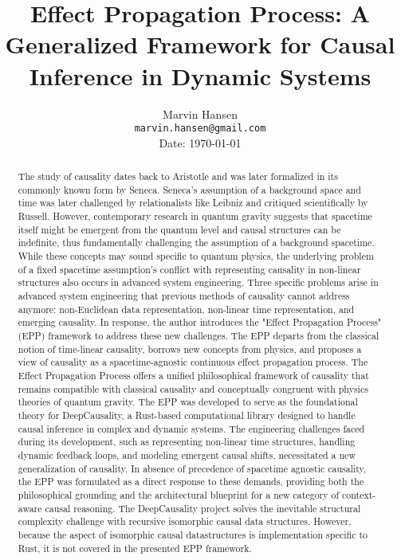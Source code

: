 \documentclass{article}
\title{Effect Propagation Process: A Generalized Framework for Causal Inference in Dynamic Systems}
\author{
  Marvin Hansen \\
  \texttt{marvin.hansen@gmail.com} \\
   Date: \today
}
\begin{document}
\maketitle

\begin{abstract}
The study of causality dates back to Aristotle and was later formalized in its commonly known form by Seneca. Seneca’s assumption of a background space and time was later challenged by relationalists like Leibniz and critiqued scientifically by Russell. However, contemporary research in quantum gravity suggests that spacetime itself might be emergent from the quantum level 
and causal structures can be indefinite, thus fundamentally challenging the assumption of a background spacetime. 
While these concepts may sound specific to quantum physics, the underlying problem of a fixed spacetime assumption's conflict with representing causality in non-linear structures also occurs in advanced system engineering. 
Three specific problems arise in advanced system engineering that previous methods of causality cannot address anymore: 
non-Euclidean data representation, non-linear time representation, and emerging causality.\newline
In response, the author introduces the "Effect Propagation Process" (EPP) framework to address these new challenges. 
The EPP departs from the classical notion of time-linear causality, borrows new concepts from physics, and proposes 
a view of  causality as a spacetime-agnostic continuous effect propagation process. The Effect Propagation Process offers 
a unified philosophical framework of causality that remains compatible with classical causality and conceptually congruent 
with physics theories of quantum gravity.\newline
The EPP was developed to serve as the foundational theory for DeepCausality, a Rust-based computational library designed 
to handle causal inference in complex and dynamic systems. The engineering challenges faced during its development, 
such as representing non-linear time structures, handling dynamic feedback loops, and modeling emergent causal shifts, 
necessitated a new generalization of causality. In absence of precedence of spacetime agnostic causality, 
the EPP was formulated as a direct response to these demands, providing both the philosophical grounding and the 
architectural blueprint for a new category of context-aware causal reasoning. The DeepCausality project solves 
the inevitable structural complexity challenge with recursive isomorphic causal data structures. However, because the aspect of isomorphic causal datastructures is implementation specific to Rust, it is not covered in the presented EPP framework.\newline

\end{abstract}
\end{document}

